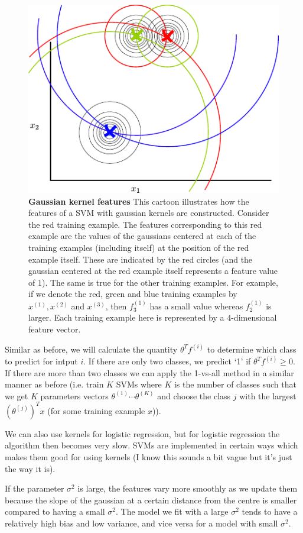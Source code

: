 \documentclass[a4paper, 10pt,hidelinks]{article}
\newcommand{\ind}[1]{^{(#1)}}
\begin{document}
\begin{figure}[h!]
\includegraphics[width=0.6\linewidth]{GaussianKernel}
\caption{\footnotesize{\textbf{Gaussian kernel features} This cartoon illustrates how the features of a SVM with gaussian kernels are constructed. Consider the red training example. The features corresponding to this red example are the values of the gaussians centered at each of the training examples (including itself) at the position of the red example itself. These are indicated by the red circles (and the gaussian centered at the red example itself represents a feature value of $1$). The same is true for the other training examples. For example, if we denote the red, green and blue training examples by $x\ind{1}, x\ind{2}$ and $x\ind{3}$, then $f_3\ind{1}$ has a small value whereas $f_2\ind{1}$ is larger. Each training example here is represented by a $4$-dimensional feature vector. }}
\label{Fig: Gaussian Kernel}
\end{figure}

Similar as before, we will calculate the quantity $\theta^T f\ind{i}$ to determine which class to predict for intput $i$. If there are only two classes, we predict `1' if $\theta^T f\ind{i} \geq 0$. If there are more than two classes we can apply the 1-vs-all method in a similar manner as before (i.e. train $K$ SVMs where $K$ is the number of classes such that we get $K$ parameters vectors $\theta\ind{1} \cdots \theta\ind{K}$ and choose the class $j$ with the largest $(\theta\ind{j})^T x$ (for some training example $x$)).

We can also use kernels for logistic regression, but for logistic regression the algorithm then becomes very slow. SVMs are implemented in certain ways which makes them good for using kernels (I know this sounds a bit vague but it's just the way it is). 

If the parameter $\sigma^2$ is large, the features vary more smoothly as we update them because the slope of the gaussian at a certain distance from the centre is smaller compared to having a small $\sigma^2$. The model we fit with a large $\sigma^2$ tends to have a relatively high bias and low variance, and vice versa for a model with small $\sigma^2$.
\end{document}
